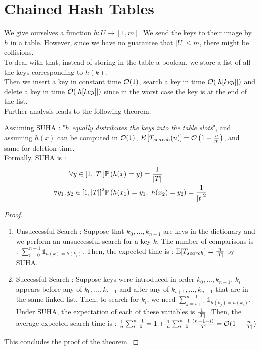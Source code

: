 \documentclass{cours}
\begin{document}
\section{Chained Hash Tables}
We give ourselves a function $h : U \rightarrow \left[1, m\right]$. We send the keys to their image by $h$ in a table. However, since we have no guarantee that $\left|U\right| \leq m$, there might be collisions.\\
To deal with that, instead of storing in the table a boolean, we store a list of all the keys corresponding to $h(k)$. \\
Then we insert a key in constant time $\mathcal{O}(1)$, search a key in time $\mathcal{O}(\left|h[key]\right|)$ and delete a key in time $\mathcal{O}(\left|h[key]\right|)$ since in the worst case the key is at the end of the list.\\

Further analysis leads to the following theorem.
\begin{theorem}
    Assuming SUHA : "\textit{$h$ equally distributes the keys into the table slots}", and assuming $h(x)$ can be computed in $\mathcal{O}(1)$, $E\left[T_{search}(n)\right] = \mathcal{O}\left(1 + \frac{n}{m}\right)$, and same for deletion time. \\
    Formally, SUHA is :
    \[
        \begin{aligned}
            \forall y \in \left[1, \left|T\right|\right]                & \mathbb{P}\left(h(x) = y\right) = \frac{1}{\left|T\right|}                                \\
            \forall y_{1}, y_{2} \in \left[1, \left|T\right|\right]^{2} & \mathbb{P}\left(h(x_{1}) = y_{1},\ h(x_{2}) = y_{2}\right) = \frac{1}{\left|t\right|^{2}}
        \end{aligned}
    \]
\end{theorem}
\begin{proof}
    \begin{enumerate}
        \item Unsuccessful Search : Suppose that $k_{0}, \ldots, k_{n-1}$ are keys in the dictionary and we perform an unsuccessful search for a key $k$.
              The number of comparisons is : $\sum_{i = 0}^{n-1} \mathbb{1}_{h(k) = h(k_{i})}$. Then, the expected time is : $\mathbb{E}[T_{search}] = \frac{n}{\left|T\right|}$ by SUHA.
        \item Successful Search : Suppose keys were introduced in order $k_{0}, \ldots, k_{n-1}$. $k_{i}$ appears before any of $k_{0}, \ldots, k_{i-1}$ and after any of $k_{i+1}, \ldots, k_{n-1}$ that are in the same linked list. Then, to search for $k_{i}$, we need $\sum_{j = i + 1}^{n- 1} \mathbb{1}_{h(k_{j}) = h(k_{i})}$. Under SUHA, the expectation of each of these variables is $\frac{1}{\left|T\right|}$. Then, the average expected search time is : $\frac{1}{n}\sum_{i = 0}^{n-1} = 1 + \frac{1}{n}\sum_{i = 0}^{n-1}\frac{(n-1-i)}{\left|T\right|} = \mathcal{O}(1 + \frac{n}{\left|T\right|})$
    \end{enumerate}
    This concludes the proof of the theorem.
\end{proof}
\end{document}
